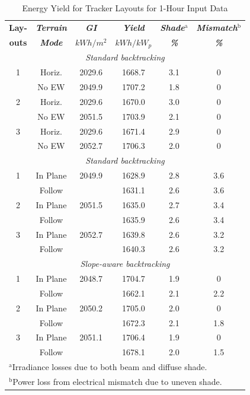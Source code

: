 \documentclass[conference]{IEEEtran}
\begin{document}
\begin{table}[htbp]
\caption{Energy Yield for Tracker Layouts for 1-Hour Input Data}
\begin{center}
\begin{tabular}{|c|c|c|c|c|c|}
\hline
\textbf{Lay-}& \textbf{\textit{Terrain}}& \textbf{\textit{GI}}& \textbf{\textit{Yield}}& \textbf{\textit{Shade$^{\mathrm{a}}$}}& \textbf{\textit{Mismatch$^{\mathrm{b}}$}} \\
\textbf{outs}& \textbf{\textit{Mode}}& \textbf{\textit{$kWh/m^2$}}& \textbf{\textit{$kWh / kW_p$}}& \textbf{\textit{\%}}& \textbf{\textit{\%}} \\
\hline
\multicolumn{6}{|c|}{\textit{Standard backtracking}} \\
\hline
1& Horiz.& 2029.6&  1668.7& 3.1& 0 \\
 & No EW & 2049.9&  1707.2& 1.8& 0 \\
\hline
2& Horiz.& 2029.6&  1670.0& 3.0& 0 \\
 & No EW & 2051.5&  1703.9& 2.1& 0 \\
\hline
3& Horiz.& 2029.6&  1671.4& 2.9& 0 \\
 & No EW & 2052.7&  1706.3& 2.0& 0 \\
\hline
\multicolumn{6}{|c|}{\textit{Standard backtracking}} \\
\hline
1& In Plane& 2049.9&  1628.9& 2.8& 3.6 \\
 & Follow&         &  1631.1& 2.6& 3.6 \\
\hline
2& In Plane& 2051.5&  1635.0& 2.7& 3.4 \\
 & Follow&         &  1635.9& 2.6& 3.4 \\
\hline
3& In Plane& 2052.7&  1639.8& 2.6& 3.2 \\
 & Follow&         &  1640.3& 2.6& 3.2 \\
\hline
\multicolumn{6}{|c|}{\textit{Slope-aware backtracking}} \\
\hline
1& In Plane& 2048.7&  1704.7& 1.9& 0 \\
 & Follow&         &  1662.1& 2.1& 2.2 \\
\hline
2& In Plane& 2050.2&  1705.0& 2.0& 0 \\
 & Follow&         &  1672.3& 2.1& 1.8 \\
\hline
3& In Plane& 2051.1&  1706.4& 1.9& 0 \\
 & Follow&         &  1678.1& 2.0& 1.5 \\
\hline
\multicolumn{6}{l}{$^{\mathrm{a}}$Irradiance losses due to both beam and diffuse shade.} \\
\multicolumn{6}{l}{$^{\mathrm{b}}$Power loss from electrical mismatch due to uneven shade.}
\end{tabular}
\label{table:energy-1hr}
\end{center}
\end{table}
\end{document}
